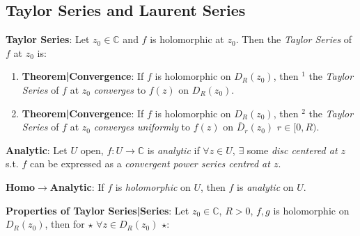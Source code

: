 \documentclass[9pt]{article}
\begin{document}
\subsection{Taylor Series and Laurent Series} %

\textbf{Taylor Series}: Let $z_0\in\mathbb{C}$ and $f$ is holomorphic at $z_0$. Then the \textit{Taylor Series} of $f$ at $z_0$ is: 

\begin{enumerate}[itemsep=-2pt, topsep=-2pt]
    \item \textbf{Theorem|Convergence}: {\footnotesize If $f$ is holomorphic on $D_{R}(z_0)$, then $^1$ the \textit{Taylor Series} of $f$ at $z_0$} \textit{converges} to $f(z)$ on $D_{R}(z_0)$.
    \item \textbf{Theorem|Convergence}: {\footnotesize If $f$ is holomorphic on $D_{R}(z_0)$, then $^2$ the \textit{Taylor Series} of $f$ at $z_0$} \textit{converges uniformly} to $f(z)$ on $\overline{D}_{r}(z_0)$ {\scriptsize $r\in[0,R)$}.
\end{enumerate}

\textbf{Analytic}: {\small Let $U$ open, $f:U\to\mathbb{C}$ is \textit{analytic} if $\forall z\in U$, $\exists$ some \textit{disc centered at $z$} s.t. $f$ can be expressed as a \textit{convergent power series centred at $z$}.}

\quad \textbf{Homo$\rightarrow$Analytic}: If $f$ is \textit{holomorphic} on $U$, then $f$ is \textit{analytic} on $U$.

\textbf{Properties of Taylor Series|Series}: Let $z_0\in\mathbb{C}$, $R>0$, $f,g$ is holomorphic on $D_{R}(z_0)$, then for $\star$ $\forall z\in D_{R}(z_0)$ $\star$:
\end{document}
